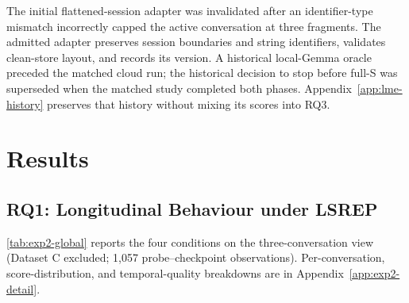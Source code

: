\documentclass[11pt,a4paper]{article}
\begin{document}
The initial flattened-session adapter was invalidated after an identifier-type mismatch incorrectly capped the active conversation at three fragments. The admitted adapter preserves session boundaries and string identifiers, validates clean-store layout, and records its version. A historical local-Gemma oracle preceded the matched cloud run; the historical decision to stop before full-S was superseded when the matched study completed both phases. Appendix~\ref{app:lme-history} preserves that history without mixing its scores into RQ3.

\section{Results}
\label{sec:results}

\subsection{RQ1: Longitudinal Behaviour under LSREP}
\label{sec:exp2}

\begin{table}[htbp]
\centering
\small
\caption{ICE v2 results for all four datasets (generalist conditions). Scores are 1--5; tokens are estimated complete-prompt counts; wins are first places in four-condition tournaments. Dataset C is the density stress case.}
\label{tab:exp2-perconv}
\end{table}


\cref{tab:exp2-global} reports the four conditions on the three-conversation view (Dataset C excluded; 1{,}057 probe--checkpoint observations). Per-conversation, score-distribution, and temporal-quality breakdowns are in Appendix~\ref{app:exp2-detail}.
\end{document}
